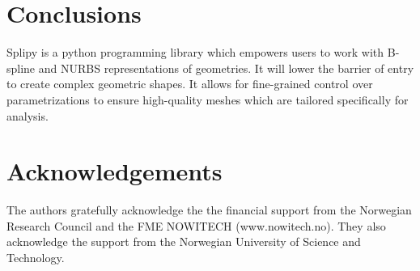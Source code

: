 \documentclass[preprint,12pt, a4paper]{elsarticle}
\begin{document}

\section{Conclusions}
\label{sec:conclusion}

Splipy is a python programming library which empowers users to work with B-spline and NURBS representations of geometries.
It will lower the barrier of entry to create complex geometric shapes.
It allows for fine-grained control over parametrizations to ensure high-quality meshes which are tailored specifically for analysis.

\section*{Acknowledgements}
\label{}

The authors gratefully acknowledge the the financial support from the Norwegian Research Council and the FME NOWITECH (www.nowitech.no). They also acknowledge the support from the Norwegian University of Science and Technology.



{}

\end{document}

